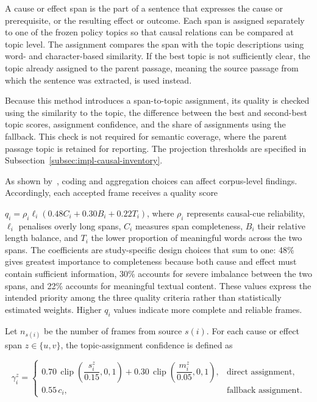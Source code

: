 A cause or effect span is the part of a sentence that expresses the cause or
prerequisite, or the resulting effect or outcome. Each span is assigned separately to
one of the frozen policy topics so that causal relations can be compared at topic
level. The assignment compares the span with the topic descriptions using word- and
character-based similarity. If the best topic is not sufficiently clear, the topic
already assigned to the parent passage, meaning the source passage from which the
sentence was extracted, is used instead.

Because this method introduces a span-to-topic assignment, its quality is checked
using the similarity to the topic, the difference between the best and second-best
topic scores, assignment confidence, and the share of assignments using the fallback.
This check is not required for semantic coverage, where the parent passage topic is
retained for reporting. The projection thresholds are specified in
Subsection~\ref{subsec:impl-causal-inventory}.

As shown by~\cite{gentzkow2019text,grimmer2013text}, coding and aggregation choices
can affect corpus-level findings. Accordingly, each accepted frame receives a quality
score

$q_i=\rho_i\ell_i(0.48C_i+0.30B_i+0.22T_i)$, where $\rho_i$ represents causal-cue
reliability, $\ell_i$ penalises overly long spans, $C_i$ measures span completeness,
$B_i$ their relative length balance, and $T_i$ the lower proportion of meaningful
words across the two spans. The coefficients are study-specific design choices that
sum to one: 48\% gives greatest importance to completeness because both cause and
effect must contain sufficient information, 30\% accounts for severe imbalance
between the two spans, and 22\% accounts for meaningful textual content. These values
express the intended priority among the three quality criteria rather than
statistically estimated weights. Higher $q_i$ values indicate more complete and
reliable frames. 

Let $n_{s(i)}$ be the number of frames from source $s(i)$. For each cause or
effect span $z\in\{u,v\}$, the topic-assignment confidence is defined as

\begin{equation}
\gamma_i^{z}
=
\begin{cases}
0.70\,\operatorname{clip}\!\left(\dfrac{s_i^{z}}{0.15},0,1\right)
+
0.30\,\operatorname{clip}\!\left(\dfrac{m_i^{z}}{0.05},0,1\right),
& \text{direct assignment}, \\[4pt]
0.55\,c_i,
& \text{fallback assignment}.
\end{cases}
\label{eq:method-topic-assignment-confidence}
\end{equation}


